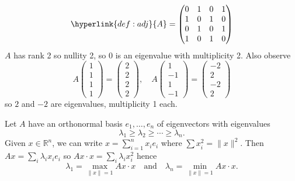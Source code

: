 \documentclass{article}
\begin{document}
\begin{eg}
\begin{enumerate}[label=\arabic*)]
\begin{center}
            \end{center}
            \begin{equation*}
                \hyperlink{def:adj}{A} =
                \begin{pmatrix}
                    0 & 1 & 0 & 1 \\
                    1 & 0 & 1 & 0 \\
                    0 & 1 & 0 & 1 \\
                    1 & 0 & 1 & 0
                \end{pmatrix}
            \end{equation*}
            $A$ has rank 2 so nullity 2, so 0 is an eigenvalue with multiplicity 2.
            Also observe
            \begin{equation*}
                A
                \begin{pmatrix}
                    1 \\ 1 \\ 1 \\ 1
                \end{pmatrix} =
                \begin{pmatrix}
                    2 \\2 \\ 2 \\ 2
                \end{pmatrix}, \quad
                A
                \begin{pmatrix}
                    1 \\ -1 \\ 1 \\ -1
                \end{pmatrix} =
                \begin{pmatrix}
                    -2 \\2 \\-2 \\ 2
                \end{pmatrix}
            \end{equation*}
            so $2$ and $-2$ are eigenvalues, multiplicity 1 each.
    \end{enumerate}
\end{eg}

Let $A$ have an orthonormal basis $e_1, \dotsc, e_n$ of eigenvectors with eigenvalues \begin{equation*}\lambda_1 \geq \lambda_2 \geq \dotsb \geq \lambda_n.\end{equation*}
Given $x \in \mathbb{R}^n$, we can write $x = \sum_{i=1}^n x_i e_i$ where $\sum x_i^2 = \|x\|^2$.
Then $Ax = \sum_i \lambda_i x_i e_i$ so $Ax \cdot x = \sum_i \lambda_i x_i^2$ hence
\begin{equation*}
    \lambda_1 = \max_{\|x\|=1} Ax \cdot x \quad \text{and} \quad \lambda_n = \min_{\|x\|=1} Ax \cdot x.
\end{equation*}
\end{document}
